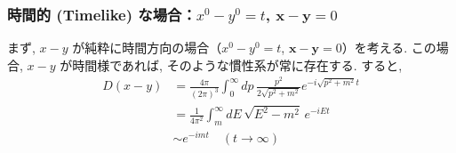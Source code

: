 \documentclass[a4paper,12pt]{article}
\begin{document}
\subsubsection*{時間的 (Timelike) な場合：$x^0 - y^0 = t$, $\mathbf{x} - \mathbf{y} = 0$}
まず, $x - y$ が純粋に時間方向の場合（$x^0 - y^0 = t$, $\mathbf{x} - \mathbf{y} = 0$）を考える. この場合, $x - y$ が時間様であれば, そのような慣性系が常に存在する. すると,
\begin{align*}
D(x - y) &= \frac{4\pi}{(2\pi)^3} \int_0^\infty dp \, \frac{p^2}{2\sqrt{p^2 + m^2}} e^{-i \sqrt{p^2 + m^2} t} \\
&= \frac{1}{4\pi^2} \int_m^\infty dE \, \sqrt{E^2 - m^2} \, e^{-i E t} \\
&\sim e^{-imt}\quad(t \to \infty) \label{2.51}\tag{2.51}
\end{align*}
\color{blue}
\end{document}
